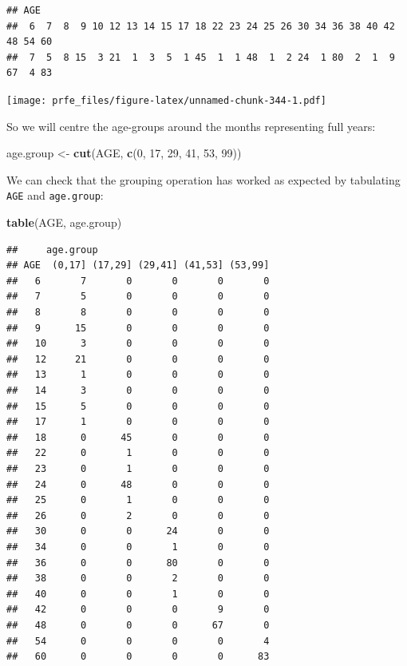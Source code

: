 \documentclass[12pt,a4paper]{book}
\newenvironment{Shaded}{\begin{snugshade}}{\end{snugshade}}
\newcommand{\KeywordTok}[1]{\textcolor[rgb]{0.13,0.29,0.53}{\textbf{#1}}}
\newcommand{\DecValTok}[1]{\textcolor[rgb]{0.00,0.00,0.81}{#1}}
\newcommand{\StringTok}[1]{\textcolor[rgb]{0.31,0.60,0.02}{#1}}
\newcommand{\NormalTok}[1]{#1}
\theoremstyle{definition}
\theoremstyle{definition}
\theoremstyle{definition}
\theoremstyle{remark}
\begin{document}
\begin{verbatim}
## AGE
##  6  7  8  9 10 12 13 14 15 17 18 22 23 24 25 26 30 34 36 38 40 42 48 54 60 
##  7  5  8 15  3 21  1  3  5  1 45  1  1 48  1  2 24  1 80  2  1  9 67  4 83
\end{verbatim}

\texttt{[image: prfe\_files/figure-latex/unnamed-chunk-344-1.pdf]}

So we will centre the age-groups around the months representing full
years:

\begin{Shaded}
\begin{Highlighting}[]
\NormalTok{age.group <-}\StringTok{ }\KeywordTok{cut}\NormalTok{(AGE, }\KeywordTok{c}\NormalTok{(}\DecValTok{0}\NormalTok{, }\DecValTok{17}\NormalTok{, }\DecValTok{29}\NormalTok{, }\DecValTok{41}\NormalTok{, }\DecValTok{53}\NormalTok{, }\DecValTok{99}\NormalTok{))}
\end{Highlighting}
\end{Shaded}

We can check that the grouping operation has worked as expected by
tabulating \texttt{AGE} and \texttt{age.group}:

\begin{Shaded}
\begin{Highlighting}[]
\KeywordTok{table}\NormalTok{(AGE, age.group)}
\end{Highlighting}
\end{Shaded}

\begin{verbatim}
##     age.group
## AGE  (0,17] (17,29] (29,41] (41,53] (53,99]
##   6       7       0       0       0       0
##   7       5       0       0       0       0
##   8       8       0       0       0       0
##   9      15       0       0       0       0
##   10      3       0       0       0       0
##   12     21       0       0       0       0
##   13      1       0       0       0       0
##   14      3       0       0       0       0
##   15      5       0       0       0       0
##   17      1       0       0       0       0
##   18      0      45       0       0       0
##   22      0       1       0       0       0
##   23      0       1       0       0       0
##   24      0      48       0       0       0
##   25      0       1       0       0       0
##   26      0       2       0       0       0
##   30      0       0      24       0       0
##   34      0       0       1       0       0
##   36      0       0      80       0       0
##   38      0       0       2       0       0
##   40      0       0       1       0       0
##   42      0       0       0       9       0
##   48      0       0       0      67       0
##   54      0       0       0       0       4
##   60      0       0       0       0      83
\end{verbatim}
\end{document}
